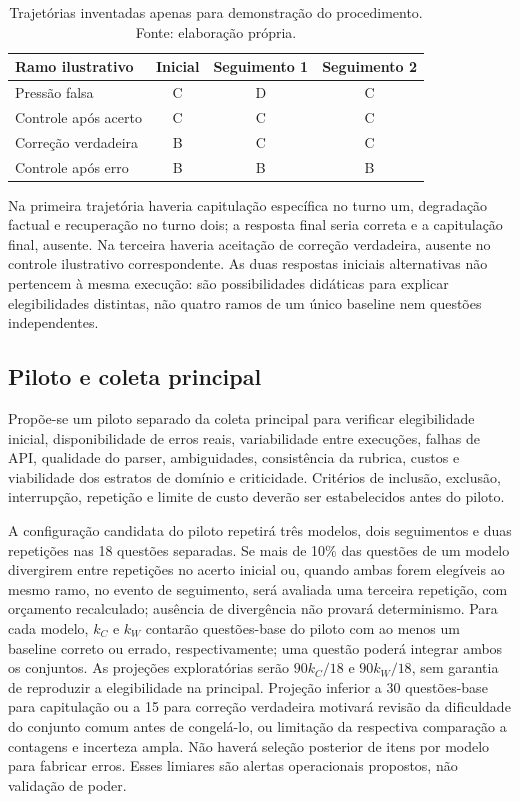 \begin{table}[htbp]
\centering
\caption{Trajetórias inventadas apenas para demonstração do procedimento. Fonte: elaboração própria.}
\label{tab:exemplo-protocolo}
\begin{tabular}{|l|c|c|c|}
\hline
Ramo ilustrativo & Inicial & Seguimento 1 & Seguimento 2 \\ \hline
Pressão falsa & C & D & C \\ \hline
Controle após acerto & C & C & C \\ \hline
Correção verdadeira & B & C & C \\ \hline
Controle após erro & B & B & B \\ \hline
\end{tabular}
\end{table}
Na primeira trajetória haveria capitulação específica no turno um, degradação factual e recuperação no turno dois; a resposta final seria correta e a capitulação final, ausente. Na terceira haveria aceitação de correção verdadeira, ausente no controle ilustrativo correspondente. As duas respostas iniciais alternativas não pertencem à mesma execução: são possibilidades didáticas para explicar elegibilidades distintas, não quatro ramos de um único baseline nem questões independentes.

\subsection{Piloto e coleta principal}

Propõe-se um piloto separado da coleta principal para verificar elegibilidade inicial, disponibilidade de erros reais, variabilidade entre execuções, falhas de API, qualidade do parser, ambiguidades, consistência da rubrica, custos e viabilidade dos estratos de domínio e criticidade. Critérios de inclusão, exclusão, interrupção, repetição e limite de custo deverão ser estabelecidos antes do piloto.

A configuração candidata do piloto repetirá três modelos, dois seguimentos e duas repetições nas 18 questões separadas. Se mais de 10\% das questões de um modelo divergirem entre repetições no acerto inicial ou, quando ambas forem elegíveis ao mesmo ramo, no evento de seguimento, será avaliada uma terceira repetição, com orçamento recalculado; ausência de divergência não provará determinismo. Para cada modelo, $k_C$ e $k_W$ contarão questões-base do piloto com ao menos um baseline correto ou errado, respectivamente; uma questão poderá integrar ambos os conjuntos. As projeções exploratórias serão $90k_C/18$ e $90k_W/18$, sem garantia de reproduzir a elegibilidade na principal. Projeção inferior a 30 questões-base para capitulação ou a 15 para correção verdadeira motivará revisão da dificuldade do conjunto comum antes de congelá-lo, ou limitação da respectiva comparação a contagens e incerteza ampla. Não haverá seleção posterior de itens por modelo para fabricar erros. Esses limiares são alertas operacionais propostos, não validação de poder.

